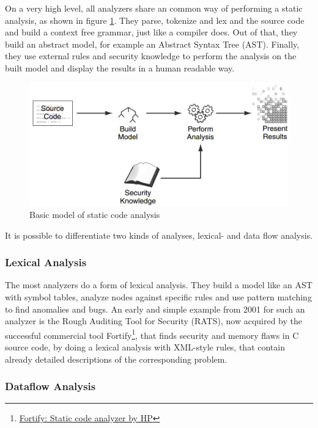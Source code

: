 \documentclass[conference]{IEEEtran}
\begin{document}
On a very high level, all analyzers share an common way of performing a static analysis, as shown in figure \ref{fig:analysis}.
They parse, tokenize and lex and the source code and build a context free grammar, just like a compiler does.
Out of that, they build an abstract model, for example an Abstract Syntax Tree (AST).
Finally, they use external rules and security knowledge to perform the analysis on the built model and display the results in a human readable way.

\begin{figure}[!t]
	\centering
	\includegraphics[width=1\linewidth]{img/analysis.png}
	\caption{Basic model of static code analysis \cite{Static_code_analysis_book_Chess:2007}}
	\label{fig:analysis}
\end{figure}

It is possible to differentiate two kinds of analyses, lexical- and data flow analysis.


\subsubsection{Lexical Analysis}
\label{subsubsec:lex_analysis}


The most analyzers do a form of lexical analysis.
They build a model like an AST with symbol tables, analyze nodes against specific rules and use pattern matching to find anomalies and bugs.
An early and simple example from 2001 for such an analyzer is the Rough Auditing Tool for Security (RATS)\cite{Static_code_analysis_book_Chess:2007}, now acquired by the successful commercial tool Fortify\footnote{\href{http://www8.hp.com/de/de/software-solutions/application-security/}{Fortify: Static code analyzer by HP}}, that finds security and memory flaws in C source code, by doing a lexical analysis with XML-style rules, that contain already detailed descriptions of the corresponding problem.


\subsubsection{Dataflow Analysis}
\label{subsubsec:dataflow_analysis}
\end{document}
